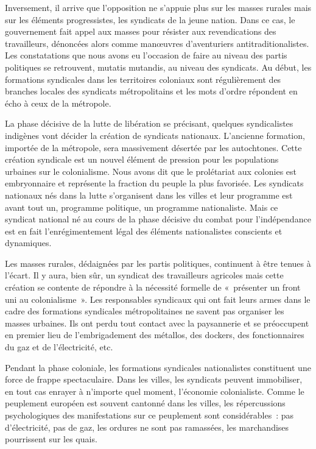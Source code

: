 \documentclass[french,twoside]{book} %
\begin{document}
Inversement, il arrive que l’opposition ne s’appuie plus sur les masses rurales mais sur les éléments progressistes, les syndicats de la jeune nation. Dans ce cas, le gouvernement fait appel aux masses pour résister aux revendications des travailleurs, dénoncées alors comme manœuvres d’aventuriers antitraditionalistes. Les constatations que nous avons eu l’occasion de faire au niveau des partis politiques se retrouvent, mutatis mutandis, au niveau des syndicats. Au début, les formations syndicales dans les territoires coloniaux sont régulièrement des branches locales des syndicats métropolitains et les mots d’ordre répondent en écho à ceux de la métropole.\par
\bigbreak
\noindent La phase décisive de la lutte de libération se précisant, quelques syndicalistes indigènes vont décider la création de syndicats nationaux. L’ancienne formation, importée de la métropole, sera massivement désertée par les autochtones. Cette création syndicale est un nouvel élément de pression pour les populations urbaines sur le colonialisme. Nous avons dit que le prolétariat aux colonies est embryonnaire et représente la fraction du peuple la plus favorisée. Les syndicats nationaux nés dans la lutte s’organisent dans les villes et leur programme est avant tout un, programme politique, un programme nationaliste. Mais ce syndicat national né au cours de la phase décisive du combat pour l’indépendance est en fait l’enrégimentement légal des éléments nationalistes conscients et dynamiques.\par
Les masses rurales, dédaignées par les partis politiques, continuent à être tenues à l’écart. Il y aura, bien sûr, un syndicat des travailleurs agricoles mais cette création se contente de   répondre à la nécessité formelle de « présenter un front uni au colonialisme ». Les responsables syndicaux qui ont fait leurs armes dans le cadre des formations syndicales métropolitaines ne savent pas organiser les masses urbaines. Ils ont perdu tout contact avec la paysannerie et se préoccupent en premier lieu de l’embrigadement des métallos, des dockers, des fonctionnaires du gaz et de l’électricité, etc.\par
Pendant la phase coloniale, les formations syndicales nationalistes constituent une force de frappe spectaculaire. Dans les villes, les syndicats peuvent immobiliser, en tout cas enrayer à n’importe quel moment, l’économie colonialiste. Comme le peuplement européen est souvent cantonné dans les villes, les répercussions psychologiques des manifestations sur ce peuplement sont considérables : pas d’électricité, pas de gaz, les ordures ne sont pas ramassées, les marchandises pourrissent sur les quais.\par
\end{document}
